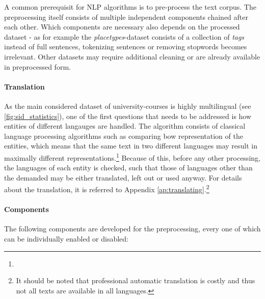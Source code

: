 A common prerequisit for NLP algorithms is to pre-process the text corpus. The preprocessing itself consists of multiple independent components chained after each other. Which components are necessary also depends on the processed dataset - as for example the \emph{placetypes}-dataset consists of a collection of \textit{tags} instead of full sentences, tokenizing sentences or removing \glspl{stopword} becomes irrelevant. Other datasets may require additional cleaning or are already available in preprocessed form.

\paragraph{Translation} As the main considered dataset of university-courses is highly multilingual (see \autoref{fig:sid_statistics}), one of the first questions that needs to be addressed is how entities of different langauges are handled. The algorithm consists of classical language processing algorithms such as comparing \gls{bow} representation of the entities, which means that the same text in two different languages may result in maximally different representations.\footnote{} Because of this, before any other processing, the languages of each entity is checked, such that those of languages other than the demanded may be either translated, left out or used anyway. For details about the translation, it is referred to Appendix \ref{ap:translating}.\footnote{It should be noted that professional automatic translation is costly and thus not all texts are available in all languages.}

\paragraph{Components} The following components are developed for the preprocessing, every one of which can be individually enabled or disabled:

